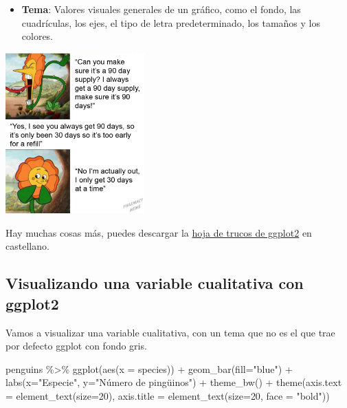 \documentclass[
  letterpaper,
  DIV=11,
  numbers=noendperiod]{scrreprt}
\newenvironment{Shaded}{\begin{snugshade}}{\end{snugshade}}
\newcommand{\AttributeTok}[1]{\textcolor[rgb]{0.40,0.45,0.13}{#1}}
\newcommand{\DecValTok}[1]{\textcolor[rgb]{0.68,0.00,0.00}{#1}}
\newcommand{\FunctionTok}[1]{\textcolor[rgb]{0.28,0.35,0.67}{#1}}
\newcommand{\NormalTok}[1]{\textcolor[rgb]{0.00,0.23,0.31}{#1}}
\newcommand{\SpecialCharTok}[1]{\textcolor[rgb]{0.37,0.37,0.37}{#1}}
\newcommand{\StringTok}[1]{\textcolor[rgb]{0.13,0.47,0.30}{#1}}
\providecommand{\tightlist}{%
  \setlength{\itemsep}{0pt}\setlength{\parskip}{0pt}}\usepackage{longtable,booktabs,array}
\begin{document}
\begin{itemize}
\tightlist
\item
  \textbf{Tema}: Valores visuales generales de un gráfico, como el
  fondo, las cuadrículas, los ejes, el tipo de letra predeterminado, los
  tamaños y los colores.
\end{itemize}

\begin{center}
\includegraphics[width=0.4\textwidth,height=0.4\textheight]{Figuras/temas.jpg}
\end{center}

Hay muchas cosas más, puedes descargar la
\href{https://diegokoz.github.io/intro_ds/fuentes/ggplot2-cheatsheet-2.1-Spanish.pdf}{hoja
de trucos de ggplot2} en castellano.

\subsection{Visualizando una variable cualitativa con
ggplot2}\label{visualizando-una-variable-cualitativa-con-ggplot2}

Vamos a visualizar una variable cualitativa, con un tema que no es el
que trae por defecto ggplot con fondo gris.

\begin{Shaded}
\begin{Highlighting}[]
\NormalTok{penguins }\SpecialCharTok{\%\textgreater{}\%} 
  \FunctionTok{ggplot}\NormalTok{(}\FunctionTok{aes}\NormalTok{(}\AttributeTok{x =}\NormalTok{ species)) }\SpecialCharTok{+}
  \FunctionTok{geom\_bar}\NormalTok{(}\AttributeTok{fill=}\StringTok{"blue"}\NormalTok{) }\SpecialCharTok{+} 
  \FunctionTok{labs}\NormalTok{(}\AttributeTok{x=}\StringTok{"Especie"}\NormalTok{, }\AttributeTok{y=}\StringTok{"Número de pingüinos"}\NormalTok{) }\SpecialCharTok{+}
  \FunctionTok{theme\_bw}\NormalTok{() }\SpecialCharTok{+}
  \FunctionTok{theme}\NormalTok{(}\AttributeTok{axis.text =} \FunctionTok{element\_text}\NormalTok{(}\AttributeTok{size=}\DecValTok{20}\NormalTok{),}
        \AttributeTok{axis.title =} \FunctionTok{element\_text}\NormalTok{(}\AttributeTok{size=}\DecValTok{20}\NormalTok{, }\AttributeTok{face =} \StringTok{"bold"}\NormalTok{)) }
\end{Highlighting}
\end{Shaded}
\end{document}
